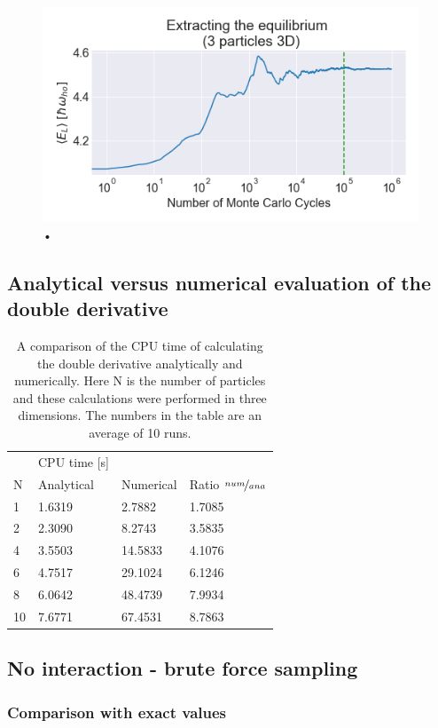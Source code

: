 \begin{figure}[H]\caption{•}\label{fig:equilibrium}
\center
\includegraphics[width=0.7\linewidth]{../Results/equilibrium}
\end{figure} 
 
 \subsection{Analytical versus numerical evaluation of the double derivative}
 
\begin{table}[H]\caption{A comparison of the CPU time of calculating the double derivative analytically and numerically. Here N is the number of particles and these calculations were performed in three dimensions. The numbers in the table are an average of 10 runs.}
\center
\begin{tabular}{l|ll|l}
& CPU time [s]&\\
N & Analytical & Numerical & Ratio $\nicefrac{num}{ana}$\\ \hline
1 & 1.6319 & 2.7882 & 1.7085\\
2 & 2.3090 & 8.2743 & 3.5835\\
4 & 3.5503 & 14.5833 & 4.1076\\
6 & 4.7517 & 29.1024 & 6.1246\\
8 & 6.0642 & 48.4739 & 7.9934\\
10 & 7.6771 & 67.4531 & 8.7863\\
\end{tabular}
\end{table}

\subsection{No interaction - brute force sampling}

\subsubsection{Comparison with exact values}

